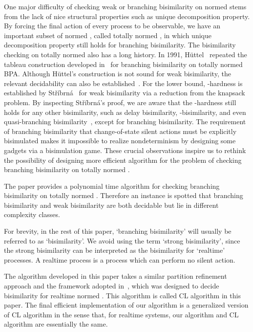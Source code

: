 \documentclass{llncs}
\begin{document}
One major difficulty of checking weak or branching bisimilarity on normed  stems from the lack of nice structural properties such as unique decomposition property.  By forcing the final action of every process to be observable, we have an important subset of normed , called totally normed , in which unique decomposition property still holds for branching bisimilarity.  The bisimilarity checking on totally normed  also has a long history.
In 1991, H\"uttel~\cite{DBLP:conf/cav/Huttel91} repeated the tableau construction developed in~\cite{DBLP:conf/lics/HuttelS91} for branching
bisimilarity on totally normed BPA. Although H\"uttel's construction is not sound for weak bisimilarity, the relevant decidability can also be established~\cite{DBLP:journals/entcs/Hirshfeld96}.  For the lower bound, -hardness is established by
St\v{r}\'{i}brn\'{a}~\cite{DBLP:journals/entcs/Stribrna98} for weak bisimilarity via a reduction from the knapsack problem.
By inspecting St\v{r}\'{i}brn\'{a}'s proof, we are aware that the -hardness still holds for any other bisimilarity, such as delay bisimilarity,  -bisimilarity, and even  quasi-branching bisimilarity~\cite{GlabbeekW96}, except for  branching bisimilarity.
The requirement of branching bisimilarity that change-of-state silent actions must be explicitly bisimulated makes it impossible to realize nondeterminism by designing some gadgets via a bisimulation game.   These crucial observations inspire us to rethink the possibility of designing more efficient algorithm for the problem of checking branching bisimilarity on totally normed .


The paper provides a polynomial time algorithm for checking branching bisimilarity on totally normed .  Therefore an instance is spotted that branching bisimilarity and weak bisimilarity are both decidable but lie in different complexity classes.

For brevity, in the rest of this paper, `branching bisimilarity' will usually be referred to as `bisimilarity'.   We avoid using the term `strong bisimilarity', since the strong bisimilarity can be interpreted as the bisimilarity for `realtime' processes. A realtime process is a process which can perform no silent action.


The algorithm developed in this paper takes a similar partition refinement approach and the framework adopted in~\cite{DBLP:conf/fsttcs/CzerwinskiL10,CzerwinskiPhD}, which was designed to decide bisimilarity for realtime normed . This algorithm is called CL algorithm in this paper.  The final efficient implementation of our algorithm is a generalized version of CL algorithm in the sense that, for realtime systems, our algorithm and CL algorithm are essentially the same.
\end{document}
